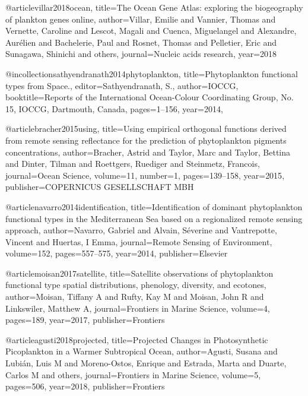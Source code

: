 {{{{{{{{{@article{villar2018ocean,
  title={The Ocean Gene Atlas: exploring the biogeography of plankton genes online},
  author={Villar, Emilie and Vannier, Thomas and Vernette, Caroline and Lescot, Magali and Cuenca, Miguelangel and Alexandre, Aur{\'e}lien and Bachelerie, Paul and Rosnet, Thomas and Pelletier, Eric and Sunagawa, Shinichi and others},
  journal={Nucleic acids research},
  year={2018}
}


@incollection{sathyendranath2014phytoplankton,
  title={Phytoplankton functional types from Space.},
  editor={Sathyendranath, S.},
  author={IOCCG},
  booktitle={Reports of the International Ocean-Colour Coordinating Group, No. 15, IOCCG, Dartmouth, Canada},
  pages={1--156},
  year={2014},
}



@article{bracher2015using,
  title={Using empirical orthogonal functions derived from remote sensing reflectance for the prediction of phytoplankton pigments concentrations},
  author={Bracher, Astrid and Taylor, Marc and Taylor, Bettina and Dinter, Tilman and Roettgers, Ruediger and Steinmetz, Francois},
  journal={Ocean Science},
  volume={11},
  number={1},
  pages={139--158},
  year={2015},
  publisher={COPERNICUS GESELLSCHAFT MBH}
}



@article{navarro2014identification,
  title={Identification of dominant phytoplankton functional types in the Mediterranean Sea based on a regionalized remote sensing approach},
  author={Navarro, Gabriel and Alvain, S{\'e}verine and Vantrepotte, Vincent and Huertas, I Emma},
  journal={Remote Sensing of Environment},
  volume={152},
  pages={557--575},
  year={2014},
  publisher={Elsevier}
}


@article{moisan2017satellite,
  title={Satellite observations of phytoplankton functional type spatial distributions, phenology, diversity, and ecotones},
  author={Moisan, Tiffany A and Rufty, Kay M and Moisan, John R and Linkswiler, Matthew A},
  journal={Frontiers in Marine Science},
  volume={4},
  pages={189},
  year={2017},
  publisher={Frontiers}
}


@article{agusti2018projected,
  title={Projected Changes in Photosynthetic Picoplankton in a Warmer Subtropical Ocean},
  author={Agusti, Susana and Lubi{\'a}n, Luis M and Moreno-Ostos, Enrique and Estrada, Marta and Duarte, Carlos M and others},
  journal={Frontiers in Marine Science},
  volume={5},
  pages={506},
  year={2018},
  publisher={Frontiers}
}



}}}}}}}}}

